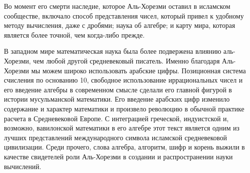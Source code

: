 \begin{displayquote}
Во момент его смерти наследие, которое Аль-Хорезми оставил в исламском сообществе, включало способ представления чисел, который привел к удобному методу вычисления, даже с дробями; наука об алгебре; и карту мира, которая является более точной, чем когда-либо прежде.

В западном мире математическая наука была более подвержена влиянию аль-Хорезми, чем любой другой средневековый писатель. Именно благодаря Аль-Хорезми мы можем широко использовать арабские цифры. Позиционная система счисления по основанию 10, свободное использование иррациональных чисел и его введение алгебры в современном смысле сделали его главной фигурой в истории мусульманской математики. Его введение арабских цифр изменило содержание и характер математики и произвело революцию в обычной практике расчета в Средневековой Европе. С интеграцией греческой, индуистской и, возможно, вавилонской математики в его алгебре этот текст является одним из лучших представлений международного символа исламской средневековой цивилизации. Среди прочего, слова алгебра, алгоритм, шифр и корень выжили в качестве свидетелей роли Аль-Хорезми в создании и распространении науки вычислений.
\end{displayquote}




